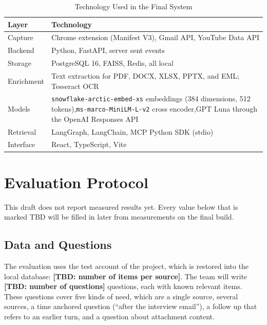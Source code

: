 \documentclass[conference]{IEEEtran}
\newcommand{\embmodel}{\texttt{snowflake\allowbreak-arctic\allowbreak-embed\allowbreak-xs}}
\newcommand{\embdim}{384}
\newcommand{\rerankmodel}{\texttt{ms\allowbreak-marco\allowbreak-MiniLM\allowbreak-L\allowbreak-6\allowbreak-v2}}
\newcommand{\llmname}{GPT\nobreakdash-5.6 Luna}
\newcommand{\tbd}[1]{\textbf{[TBD: #1]}}
\begin{document}
\begin{table}[t]
\caption{Technology Used in the Final System}
\label{tab:stack}
\centering
\renewcommand{\arraystretch}{1.15}
\begin{tabular}{|>{\raggedright\arraybackslash}p{2.0cm}|>{\raggedright\arraybackslash}p{5.55cm}|}
\hline
\textbf{Layer} & \textbf{Technology} \\
\hline
Capture & Chrome extension (Manifest V3), Gmail API, YouTube Data API \\
\hline
Backend & Python, FastAPI, server sent events \\
\hline
Storage & PostgreSQL 16, FAISS, Redis, all local \\
\hline
Enrichment & Text extraction for PDF, DOCX, XLSX, PPTX, and EML; Tesseract OCR \\
\hline
Models & \embmodel{} embeddings (\embdim{} dimensions, 512 tokens),\newline \rerankmodel{} cross encoder,\newline \llmname{} through the OpenAI Responses API \\
\hline
Retrieval & LangGraph, LangChain, MCP Python SDK (stdio) \\
\hline
Interface & React, TypeScript, Vite \\
\hline
\end{tabular}
\end{table}

\section{Evaluation Protocol}\label{sec:eval}
This draft does not report measured results yet. Every value below that is marked TBD will be filled in later from measurements on the final build.

\subsection{Data and Questions}
The evaluation uses the test account of the project, which is restored into the local database: \tbd{number of items per source}. The team will write \tbd{number of questions} questions, each with known relevant items. These questions cover five kinds of need, which are a single source, several sources, a time anchored question (``after the interview email''), a follow up that refers to an earlier turn, and a question about attachment content.
\end{document}
